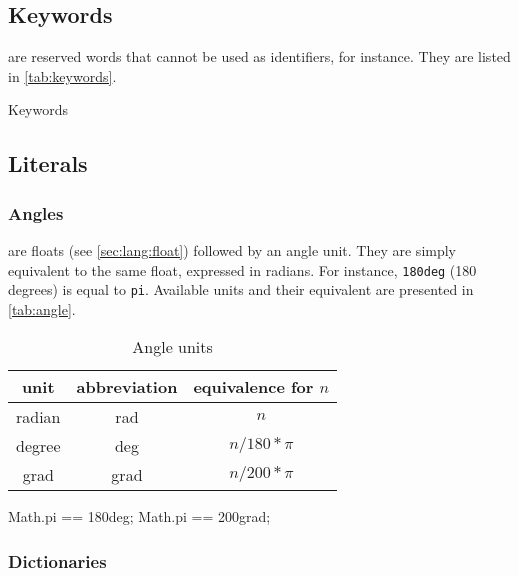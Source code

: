 \subsection{Keywords}
\label{sec:lang:keywords}

 are reserved words that cannot be used as identifiers,
for instance.  They are listed in \autoref{tab:keywords}.

\renewcommand{\baselinestretch}{.85}
\begin{table}[\floatpos]
  \centering
  
  \caption{Keywords}
  \label{tab:keywords}
\end{table}
\renewcommand{\baselinestretch}{1}

\subsection{Literals}

\subsubsection{Angles}

 are floats (see \autoref{sec:lang:float}) followed by an
angle unit. They are simply equivalent to the same float, expressed in
radians. For instance, \lstinline|180deg| (180 degrees) is equal to
\lstinline{pi}. Available units and their equivalent are presented in
\autoref{tab:angle}.

\begin{table}[\floatposh]
  \centering
  \begin{tabular}{|c|c|c|}
    \hline
    unit        & abbreviation & equivalence for $n$  \\
    \hline
    radian      & rad          & $n$         \\
    degree      & deg          & $n / 180 * \pi$        \\
    grad        & grad         & $n / 200 * \pi$        \\
    \hline
  \end{tabular}
  \caption{Angle units}
  \label{tab:angle}
\end{table}

\begin{urbiassert}
Math.pi == 180deg;
Math.pi == 200grad;
\end{urbiassert}

\subsubsection{Dictionaries}
\label{sec:lang:dictionary}

